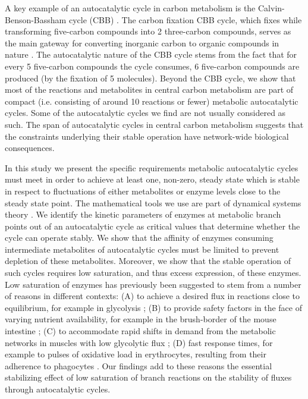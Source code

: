     A key example of an autocatalytic cycle in carbon metabolism is the Calvin-Benson-Bassham cycle (CBB) \cite{Benson1950-cl}.
    The carbon fixation CBB cycle, which fixes  while transforming five-carbon compounds into 2 three-carbon compounds, serves as the main gateway for converting inorganic carbon to organic compounds in nature \cite{Raven2012-le}.
    The autocatalytic nature of the CBB cycle stems from the fact that for every 5 five-carbon compounds the cycle consumes, 6 five-carbon compounds are produced (by the fixation of 5  molecules).
    Beyond the CBB cycle, we show that most of the reactions and metabolites in central carbon metabolism are part of compact (i.e. consisting of around 10 reactions or fewer) metabolic autocatalytic cycles.
    Some of the autocatalytic cycles we find are not usually considered as such.
    The span of autocatalytic cycles in central carbon metabolism suggests that the constraints underlying their stable operation have network-wide biological consequences.

    In this study we present the specific requirements metabolic autocatalytic cycles must meet in order to achieve at least one, non-zero, steady state which is stable in respect to fluctuations of either metabolites or enzyme levels close to the steady state point.
    The mathematical tools we use are part of dynamical systems theory \cite{Strogatz2014-hp}.
    We identify the kinetic parameters of enzymes at metabolic branch points out of an autocatalytic cycle as critical values that determine whether the cycle can operate stably.
    We show that the affinity of enzymes consuming intermediate metabolites of autocatalytic cycles must be limited to prevent depletion of these metabolites.
    Moreover, we show that the stable operation of such cycles requires low saturation, and thus excess expression, of these enzymes.
    Low saturation of enzymes has previously been suggested to stem from a number of reasons in different contexts:
    (A) to achieve a desired flux in reactions close to equilibrium, for example in glycolysis \cite{Staples1997-fq,Eanes2006-gh,Flamholz2013-bb};
    (B) to provide safety factors in the face of varying nutrient availability, for example in the brush-border of the mouse intestine \cite{Weiss1998-gp};
    (C) to accommodate rapid shifts in demand from the metabolic networks in muscles with low glycolytic flux \cite{Suarez1997-jo};
    (D) fast response times, for example to pulses of oxidative load in erythrocytes, resulting from their adherence to phagocytes \cite{Salvador2003-fc}.
    Our findings add to these reasons the essential stabilizing effect of low saturation of branch reactions on the stability of fluxes through autocatalytic cycles.

